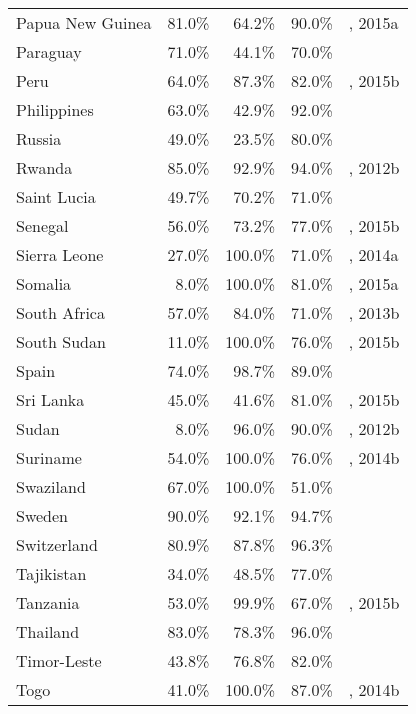 \begin{longtable}{lrrrl}
  Papua New Guinea & 81.0\% & 64.2\% & 90.0\% & \cite{Unaids2016-an}, 2015a \\
  Paraguay & 71.0\% & 44.1\% & 70.0\% & \cite{Unaids2016-an} \\
  Peru & 64.0\% & 87.3\% & 82.0\% & \cite{Unaids2016-an}, 2015b \\
  Philippines & 63.0\% & 42.9\% & 92.0\% & \cite{Unaids2016-an} \\
  Russia & 49.0\% & 23.5\% & 80.0\% & \cite{pokrovskaya2014cascade} \\
  Rwanda & 85.0\% & 92.9\% & 94.0\% & \cite{Unaids2016-an}, 2012b \\
  Saint Lucia & 49.7\% & 70.2\% & 71.0\% & \cite{Unaids2016-an, Unaids2016-am} \\
  Senegal & 56.0\% & 73.2\% & 77.0\% & \cite{Unaids2016-an}, 2015b \\
  Sierra Leone & 27.0\% & 100.0\% & 71.0\% & \cite{Unaids2016-an}, 2014a \\
  Somalia & 8.0\% & 100.0\% & 81.0\% & \cite{Unaids2016-an}, 2015a \\
  South Africa & 57.0\% & 84.0\% & 71.0\% & \cite{Unaids2016-an}, 2013b \\
  South Sudan & 11.0\% & 100.0\% & 76.0\% & \cite{Unaids2016-an}, 2015b \\
  Spain & 74.0\% & 98.7\% & 89.0\% & \cite{Unaids2016-an} \\
  Sri Lanka & 45.0\% & 41.6\% & 81.0\% & \cite{Unaids2016-an}, 2015b \\
  Sudan & 8.0\% & 96.0\% & 90.0\% & \cite{Unaids2016-an}, 2012b \\
  Suriname & 54.0\% & 100.0\% & 76.0\% & \cite{Unaids2016-an}, 2014b \\
  Swaziland & 67.0\% & 100.0\% & 51.0\% & \cite{Unaids2016-an} \\
  Sweden & 90.0\% & 92.1\% & 94.7\% & \cite{croi2016} \\
  Switzerland & 80.9\% & 87.8\% & 96.3\% & \cite{ias2015} \\
  Tajikistan & 34.0\% & 48.5\% & 77.0\% & \cite{Unaids2016-an} \\
  Tanzania & 53.0\% & 99.9\% & 67.0\% & \cite{Unaids2016-an}, 2015b \\
  Thailand & 83.0\% & 78.3\% & 96.0\% & \cite{Unaids2016-an} \\
  Timor-Leste & 43.8\% & 76.8\% & 82.0\% & \cite{Unaids2016-am} \\
  Togo & 41.0\% & 100.0\% & 87.0\% & \cite{Unaids2016-an}, 2014b \\

\end{longtable}
